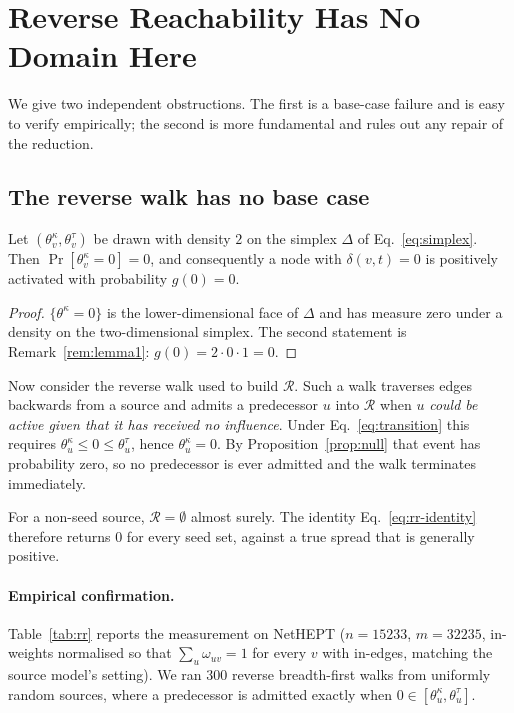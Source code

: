 \section{Reverse Reachability Has No Domain Here}
\label{sec:inapplicability}

We give two independent obstructions. The first is a base-case failure and is easy to verify
empirically; the second is more fundamental and rules out any repair of the reduction.

\subsection{The reverse walk has no base case}

\begin{proposition}
\label{prop:null}
Let $(\theta^\kappa_v, \theta^\tau_v)$ be drawn with density $2$ on the simplex
$\Delta$ of Eq.~\eqref{eq:simplex}. Then $\Pr[\theta^\kappa_v = 0] = 0$, and consequently a node
with $\delta(v,t) = 0$ is positively activated with probability $g(0) = 0$.
\end{proposition}

\begin{proof}
$\{\theta^\kappa = 0\}$ is the lower-dimensional face of $\Delta$ and has measure zero under a
density on the two-dimensional simplex. The second statement is Remark~\ref{rem:lemma1}:
$g(0) = 2 \cdot 0 \cdot 1 = 0$.
\end{proof}

Now consider the reverse walk used to build $\mathcal{R}$. Such a walk traverses edges backwards
from a source and admits a predecessor $u$ into $\mathcal{R}$ when $u$ \emph{could be active given
that it has received no influence}. Under Eq.~\eqref{eq:transition} this requires
$\theta^\kappa_u \le 0 \le \theta^\tau_u$, hence $\theta^\kappa_u = 0$. By
Proposition~\ref{prop:null} that event has probability zero, so no predecessor is ever admitted
and the walk terminates immediately.

\begin{corollary}
\label{cor:empty}
For a non-seed source, $\mathcal{R} = \emptyset$ almost surely. The identity
Eq.~\eqref{eq:rr-identity} therefore returns $0$ for every seed set, against a true spread that is
generally positive.
\end{corollary}

\paragraph{Empirical confirmation.}
Table~\ref{tab:rr} reports the measurement on NetHEPT ($n = 15233$, $m = 32235$, in-weights
normalised so that $\sum_u \omega_{uv} = 1$ for every $v$ with in-edges, matching the source
model's setting). We ran $300$ reverse breadth-first walks from uniformly random sources, where a
predecessor is admitted exactly when $0 \in [\theta^\kappa_u, \theta^\tau_u]$.

